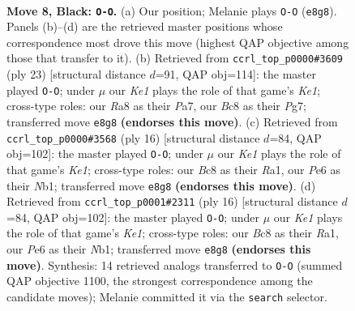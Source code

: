 \documentclass[11pt]{article}
\begin{document}
\begin{figure}[p]\centering
\begin{subfigure}{0.46\textwidth}\centering
\resizebox{\linewidth}{!}{%
\newchessgame
\chessboard[
  setfen={rnb1k2r/pppn1ppp/4p3/3pP3/1q1P3P/2N5/PPP2PP1/1R1QKBNR b Kkq - 2 8},
  showmover=false,
  pgfstyle=straightmove, color=movearrow, markmove={e8-g8}
]}
\caption{}
\end{subfigure}\hfill
\begin{subfigure}{0.46\textwidth}\centering
\resizebox{\linewidth}{!}{%
\newchessgame
\chessboard[
  setfen={r3k2r/pp1n1ppp/2p1p3/5n2/1q1P4/1BN1P3/PP3PPP/R2QK2R b KQkq - 2 12},
  showmover=false,
  pgfstyle=straightmove, color=movearrow, markmove={e8-g8}
]}
\caption{}
\end{subfigure}
\\[4pt]
\begin{subfigure}{0.46\textwidth}\centering
\resizebox{\linewidth}{!}{%
\newchessgame
\chessboard[
  setfen={r1bqk2r/ppp2ppp/2n1p3/8/QnpP4/5NP1/PP2PPBP/RN2K2R w KQkq - 0 9},
  showmover=false,
  pgfstyle=straightmove, color=movearrow, markmove={e1-g1}
]}
\caption{}
\end{subfigure}\hfill
\begin{subfigure}{0.46\textwidth}\centering
\resizebox{\linewidth}{!}{%
\newchessgame
\chessboard[
  setfen={r1bqk2r/ppp2ppp/2n1p3/8/QnpP4/5NP1/PP2PPBP/RN2K2R w KQkq - 0 9},
  showmover=false,
  pgfstyle=straightmove, color=movearrow, markmove={e1-g1}
]}
\caption{}
\end{subfigure}
\caption{\textbf{Move 8, Black: \texttt{O-O}.} (a) Our position; Melanie plays \texttt{O-O} (\texttt{e8g8}). Panels (b)--(d) are the retrieved master positions whose correspondence most drove this move (highest QAP objective among those that transfer to it). (b) Retrieved from \texttt{ccrl\_top\_p0000\#3609} (ply 23) [structural distance $d$=91, QAP obj=114]: the master played \texttt{O-O}; under $\mu$ our \emph{Ke1} plays the role of that game's \emph{Ke1}; cross-type roles: our \emph{R}a8 as their \emph{P}a7, our \emph{B}c8 as their \emph{P}g7; transferred move \texttt{e8g8} \textbf{(endorses this move)}. (c) Retrieved from \texttt{ccrl\_top\_p0000\#3568} (ply 16) [structural distance $d$=84, QAP obj=102]: the master played \texttt{O-O}; under $\mu$ our \emph{Ke1} plays the role of that game's \emph{Ke1}; cross-type roles: our \emph{B}c8 as their \emph{R}a1, our \emph{P}e6 as their \emph{N}b1; transferred move \texttt{e8g8} \textbf{(endorses this move)}. (d) Retrieved from \texttt{ccrl\_top\_p0001\#2311} (ply 16) [structural distance $d$=84, QAP obj=102]: the master played \texttt{O-O}; under $\mu$ our \emph{Ke1} plays the role of that game's \emph{Ke1}; cross-type roles: our \emph{B}c8 as their \emph{R}a1, our \emph{P}e6 as their \emph{N}b1; transferred move \texttt{e8g8} \textbf{(endorses this move)}. Synthesis: 14 retrieved analogs transferred to \texttt{O-O} (summed QAP objective 1100, the strongest correspondence among the candidate moves); Melanie committed it via the \texttt{search} selector.}
\label{fig:thought-m15}
\end{figure}
\end{document}

